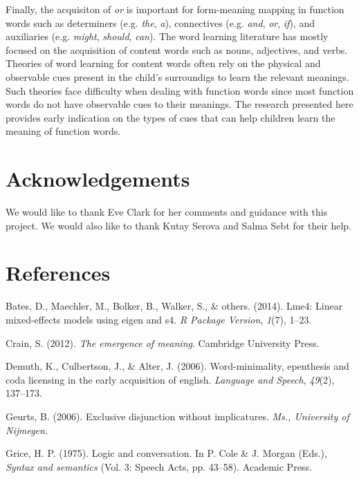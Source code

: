 \documentclass[10pt, letterpaper]{article}
\begin{document}
Finally, the acquisiton of \emph{or} is important for form-meaning
mapping in function words such as determiners (e.g. \emph{the},
\emph{a}), connectives (e.g. \emph{and}, \emph{or}, \emph{if}), and
auxiliaries (e.g. \emph{might}, \emph{should}, \emph{can}). The word
learning literature has mostly focused on the acquisition of content
words such as nouns, adjectives, and verbs. Theories of word learning
for content words often rely on the physical and observable cues present
in the child's surroundigs to learn the relevant meanings. Such theories
face difficulty when dealing with function words since most function
words do not have observable cues to their meanings. The research
presented here provides early indication on the types of cues that can
help children learn the meaning of function words.

\section{Acknowledgements}\label{acknowledgements}

We would like to thank Eve Clark for her comments and guidance with this
project. We would also like to thank Kutay Serova and Salma Sebt for
their help.

\section{References}\label{references}

\setlength{\parindent}{-0.1in} \setlength{\leftskip}{0.125in} \noindent

\hypertarget{refs}{}
\hypertarget{ref-bates2014lme4}{}
Bates, D., Maechler, M., Bolker, B., Walker, S., \& others. (2014).
Lme4: Linear mixed-effects models using eigen and s4. \emph{R Package
Version}, \emph{1}(7), 1--23.

\hypertarget{ref-crain2012emergence}{}
Crain, S. (2012). \emph{The emergence of meaning}. Cambridge University
Press.

\hypertarget{ref-demuth2006word}{}
Demuth, K., Culbertson, J., \& Alter, J. (2006). Word-minimality,
epenthesis and coda licensing in the early acquisition of english.
\emph{Language and Speech}, \emph{49}(2), 137--173.

\hypertarget{ref-geurts2006exclusive}{}
Geurts, B. (2006). Exclusive disjunction without implicatures.
\emph{Ms., University of Nijmegen}.

\hypertarget{ref-grice1975logicconvo}{}
Grice, H. P. (1975). Logic and conversation. In P. Cole \& J. Morgan
(Eds.), \emph{Syntax and semantics} (Vol. 3: Speech Acts, pp. 43--58).
Academic Press.
\end{document}
